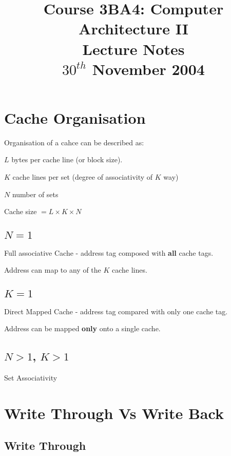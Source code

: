 \documentclass[a4paper,12pt]{article}
\begin{document}
\title{Course 3BA4: Computer Architecture II \\ Lecture Notes \\ $30^{th}$ November 2004}

\maketitle

\section*{Cache Organisation}

Organisation of a cahce can be described as:

$L$ bytes per cache line (or block size).

$K$ cache lines per set (degree of associativity of $K$ way)

$N$ number of sets

Cache size $= L \times K \times N$

\subsection*{$N = 1$}

Full associative Cache - address tag composed with \textbf{all} cache
tags.

Address can map to any of the $K$ cache lines.

\subsection*{$K = 1$}

Direct Mapped Cache - address tag compared with only one cache tag.

Address can be mapped \textbf{only} onto a single cache.

\subsection*{$N > 1$, $K > 1$}

Set Associativity


\section*{Write Through Vs Write Back}

\subsection*{Write Through}
\end{document}
